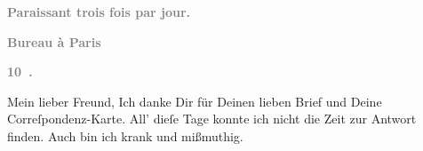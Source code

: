 \pstart
           \begin{otherlanguage}{french}\textcolor{gray}{\textbf{\textbf{Paraissant trois fois par jour.}}}\end{otherlanguage}\pend
           
\pstart
           \begin{otherlanguage}{french}\textcolor{gray}{\textbf{\textbf{Bureau à Paris}}}\end{otherlanguage}\pend
           
\pstart
           \begin{otherlanguage}{french}\textcolor{gray}{\textbf{\textbf{10 .}}}\end{otherlanguage}\pend
           
\pstart\center{}Mein lieber Freund,\pend\vspace{0.5em}
\pstart
           Ich danke Dir für Deinen lieben Brief und Deine Correſpondenz-Karte. All’ dieſe Tage
               konnte ich nicht die Zeit zur Antwort finden. Auch bin ich krank und mißmuthig.\pend
           
